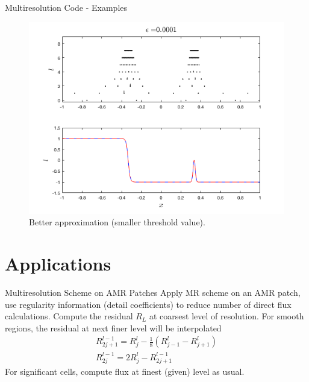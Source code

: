 \documentclass{beamer}
\begin{document}
\begin{frame}[shrink=10]{Multiresolution Code - Examples}
	\begin{figure}
		\center
		\includegraphics[scale=0.5]{plots/spike-med.png}
		\caption{Better approximation (smaller threshold value).}
	\end{figure}
\end{frame}

\section{Applications}

\begin{frame}[shrink=10]{Multiresolution Scheme on AMR Patches}
    Apply MR scheme on an AMR patch, use regularity information (detail coefficients) to reduce number of direct flux calculations.
    Compute the residual $R_{L}$ at coarsest level of resolution. For smooth regions, the residual at next finer level will be
    interpolated
    \begin{align*}
        R^{l-1}_{2j+1} = R^{l}_{j} - \frac{1}{8} \left( R^{l}_{j-1} - R^{l}_{j+1} \right) \\
        R^{l-1}_{2j} = 2 R^{l}_{j} - R^{l-1}_{2j+1}
    \end{align*}
    For significant cells, compute flux at finest (given) level as usual.
\end{frame}
\end{document}
